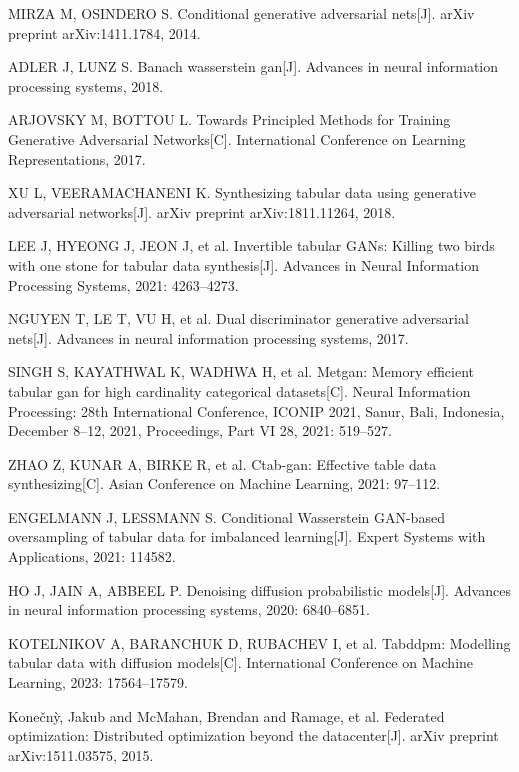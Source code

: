 \begin{thebibliography}{200}
	MIRZA M, OSINDERO S. Conditional generative adversarial nets[J]. arXiv preprint arXiv:1411.1784, 2014.
	
	ADLER J, LUNZ S. Banach wasserstein gan[J]. Advances in neural information processing systems, 2018.
	
	ARJOVSKY M, BOTTOU L. Towards Principled Methods for Training Generative Adversarial Networks[C]. International Conference on Learning Representations, 2017.
	
	XU L, VEERAMACHANENI K. Synthesizing tabular data using generative adversarial networks[J]. arXiv preprint arXiv:1811.11264, 2018.
	
	LEE J, HYEONG J, JEON J, et al. Invertible tabular GANs: Killing two birds with one stone for tabular data synthesis[J]. Advances in Neural Information Processing Systems, 2021: 4263--4273.
	
	NGUYEN T, LE T, VU H, et al. Dual discriminator generative adversarial nets[J]. Advances in neural information processing systems, 2017.
	
	SINGH S, KAYATHWAL K, WADHWA H, et al. Metgan: Memory efficient tabular gan for high cardinality categorical datasets[C]. Neural Information Processing: 28th International Conference, ICONIP 2021, Sanur, Bali, Indonesia, December 8--12, 2021, Proceedings, Part VI 28, 2021: 519--527.
	
	ZHAO Z, KUNAR A, BIRKE R, et al. Ctab-gan: Effective table data synthesizing[C]. Asian Conference on Machine Learning, 2021: 97--112.
	
	ENGELMANN J, LESSMANN S. Conditional Wasserstein GAN-based oversampling of tabular data for imbalanced learning[J]. Expert Systems with Applications, 2021: 114582.
	
	HO J, JAIN A, ABBEEL P. Denoising diffusion probabilistic models[J]. Advances in neural information processing systems, 2020: 6840--6851.
	
	KOTELNIKOV A, BARANCHUK D, RUBACHEV I, et al. Tabddpm: Modelling tabular data with diffusion models[C]. International Conference on Machine Learning, 2023: 17564--17579.
	
	Kone{\v{c}}n{\`y}, Jakub and McMahan, Brendan and Ramage, et al. Federated optimization: Distributed optimization beyond the datacenter[J]. arXiv preprint arXiv:1511.03575, 2015.
	

\end{thebibliography}
